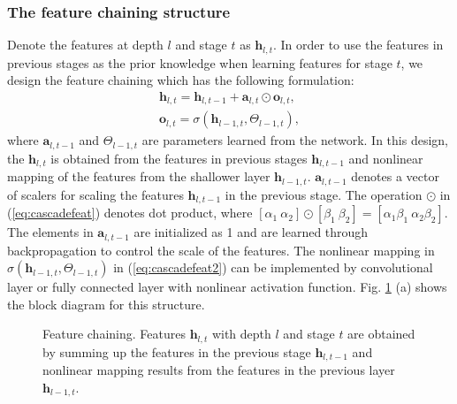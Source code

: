 \documentclass[10pt,twocolumn,letterpaper]{article}
\begin{document}
\subsubsection{The feature chaining structure}
Denote the features at depth $l$ and stage $t$ as $\mathbf{h}_{l,t}$.
In order to use the features in previous stages as the prior knowledge when learning features for stage $t$, we design the feature chaining which has the following formulation:
\begin{align}
\mathbf{h}_{l,t} =\mathbf{h}_{l,t-1} +  \mathbf{a}_{l,t} \odot \mathbf{o}_{l,t},  \label{eq:cascadefeat}\\
 \mathbf{o}_{l, t} = \sigma(\mathbf{h}_{l-1,t}, \Theta_{l-1,t}),
 \label{eq:cascadefeat2}
\end{align}
where $\mathbf{a}_{l,t-1}$ and $ \Theta_{l-1,t}$ are parameters learned from the network. In this design, the $\mathbf{h}_{l,t} $ is obtained from the features in previous stages $\mathbf{h}_{l,t-1}$ and nonlinear mapping of the features from the shallower layer $\mathbf{h}_{l-1,t}$. $\mathbf{a}_{l,t-1}$ denotes a vector of scalers for scaling the features $ \mathbf{h}_{l,t-1}$ in the previous stage. The operation $\odot$ in (\ref{eq:cascadefeat}) denotes dot product, where $[\alpha_1 \  \alpha_2]\odot [\beta_1 \ \beta_2] = [\alpha_1\beta_1 \ \alpha_2 \beta_2]$.  The elements in $\mathbf{a}_{l,t-1}$ are initialized as 1 and are learned through backpropagation to control the scale of the features. 
The nonlinear mapping in $\sigma(\mathbf{h}_{l-1,t}, \Theta_{l-1,t})$ in (\ref{eq:cascadefeat2}) can be implemented by convolutional layer or fully connected layer with nonlinear activation function. Fig. \ref{fig:Cascade} (a) shows the block diagram for this structure. 

\begin{figure}
\begin{center}
 \centerline{}
\end{center}
\vspace{-10pt}
   \caption{Feature chaining. Features $\mathbf{h}_{l,t}$ with depth $l$ and stage $t$ are obtained by summing up the features in the previous stage $\mathbf{h}_{l,t-1}$ and nonlinear mapping results from the features in the previous layer  $\mathbf{h}_{l-1,t}$.  }
\label{fig:Cascade}
\end{figure}
\end{document}

